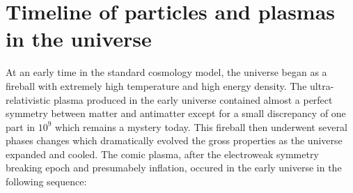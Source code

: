 \documentclass[Universe,article,submit,moreauthors,pdftex]{Definitions/mdpi}
\begin{document}
\section{Timeline of particles and plasmas in the universe}\label{sec:Timeline}
\noindent At an early time in the standard cosmology model, the universe began as a fireball with extremely high temperature and high energy density. The ultra-relativistic plasma produced in the early universe contained almost a perfect symmetry between matter and antimatter except for a small discrepancy of one part in $10^{9}$ which remains a mystery today. This fireball then underwent several phases changes which dramatically evolved the gross properties as the universe expanded and cooled. The comic plasma, after the electroweak symmetry breaking epoch and presumabely inflation, occured in the early universe in the following sequence:
\end{document}
